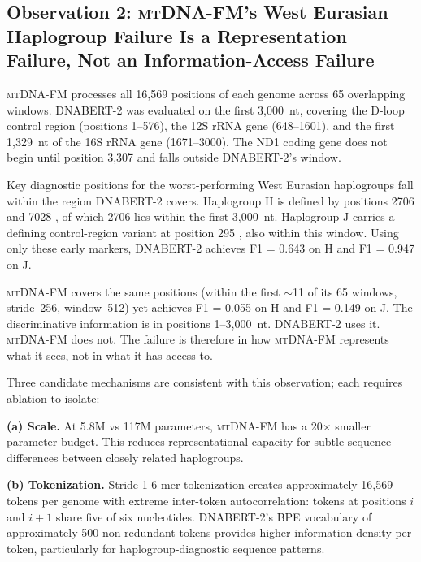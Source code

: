 \documentclass[10pt]{article}
\newcommand{\mtdnafm}{\textsc{mtDNA-FM}\xspace}
\begin{document}
\subsection{Observation 2: \mtdnafm{}'s West Eurasian Haplogroup Failure Is a Representation Failure,
Not an Information-Access Failure}
\label{sec:rep_failure}

\mtdnafm{} processes all 16,569 positions of each genome across 65 overlapping windows.
DNABERT-2 was evaluated on the first 3,000~nt, covering the D-loop control region (positions
1--576), the 12S rRNA gene (648--1601), and the first 1,329~nt of the 16S rRNA gene
(1671--3000). The ND1 coding gene does not begin until position 3,307 and falls outside
DNABERT-2's window.

Key diagnostic positions for the worst-performing West Eurasian haplogroups fall within the
region DNABERT-2 covers. Haplogroup H is defined by positions 2706 and 7028
\citep{vanoven2009phylotree}, of which 2706 lies within the first 3,000~nt. Haplogroup J carries
a defining control-region variant at position 295 \citep{vanoven2009phylotree}, also within this
window. Using only these early markers, DNABERT-2 achieves F1 = 0.643 on H and F1 = 0.947 on J.

\mtdnafm{} covers the same positions (within the first $\sim$11 of its 65 windows, stride~256,
window~512) yet achieves F1 = 0.055 on H and F1 = 0.149 on J. The discriminative information
is in positions 1--3,000~nt. DNABERT-2 uses it. \mtdnafm{} does not. The failure is therefore
in how \mtdnafm{} represents what it sees, not in what it has access to.

Three candidate mechanisms are consistent with this observation; each requires ablation to
isolate:

\noindent\textbf{(a) Scale.} At 5.8M vs 117M parameters, \mtdnafm{} has a 20$\times$ smaller
parameter budget. This reduces representational capacity for subtle sequence differences between
closely related haplogroups.

\noindent\textbf{(b) Tokenization.} Stride-1 6-mer tokenization creates approximately 16,569
tokens per genome with extreme inter-token autocorrelation: tokens at positions $i$ and $i+1$
share five of six nucleotides. DNABERT-2's BPE vocabulary \citep{zhou2024dnabert2} of
approximately 500 non-redundant tokens provides higher information density per token,
particularly for haplogroup-diagnostic sequence patterns.
\end{document}
